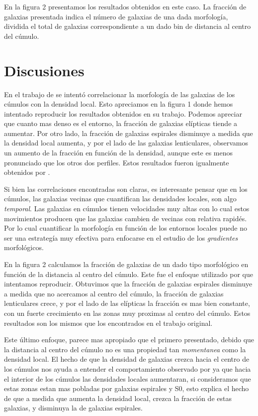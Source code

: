\documentclass[a4paper,10pt]{article}
\begin{document}
En la figura 2 presentamos los resultados obtenidos en este caso. La fracci\'on de galaxias presentada indica el n\'umero de galaxias de una dada morfolog\'ia, dividida el total de galaxias correspondiente a un dado bin de distancia al centro del c\'umulo.

\section{Discusiones}
En el trabajo de \citet{Dressler1980} se intent\'o correlacionar la morfolog\'ia de las galaxias de los c\'umulos con la densidad local. Esto apreciamos en la figura 1 donde hemos intentado reproducir los resultados obtenidos en su trabajo. Podemos apreciar que cuanto mas denso es el entorno, la fracci\'on de galaxias el\'ipticas tiende a aumentar. Por otro lado, la fracci\'on de galaxias espirales disminuye a medida que la densidad local aumenta, y por el lado de las galaxias lenticulares, observamos un aumento de la fracci\'on en funci\'on de la densidad, aunque este es menos pronunciado que los otros dos perfiles. Estos resultados fueron igualmente obtenidos por \citet{Dressler1980}. 

Si bien las correlaciones encontradas son claras, es interesante pensar que en los c\'umulos, las galaxias vecinas que cuantifican las densidades locales, son algo \textit{temporal}. Las galaxias en c\'umulos tienen velocidades muy altas con lo cual estos movimientos producen que las galaxias cambien de vecinas con relativa rapid\'es. Por lo cual cuantificar la morfolog\'ia en funci\'on de los entornos locales puede no ser una estrateg\'ia muy efectiva para enfocarse en el estudio de los \textit{gradientes} morfol\'ogicos. 

En la figura 2 calculamos la fracci\'on de galaxias de un dado tipo morfol\'ogico en funci\'on de la distancia al centro del c\'umulo. Este fue el enfoque utilizado por \citet{Whitmore1993} que intentamos reproducir. Obtuvimos que la fracci\'on de galaxias espirales disminuye a medida que no acercamos al centro del c\'umulo, la fracci\'on de galaxias lenticulares crece, y por el lado de las el\'ipticas la fracci\'on es mas bien constante, con un fuerte crecimiento en las zonas muy proximas al centro del c\'umulo. Estos resultados son los mismos que los encontrados en el trabajo original.

Este \'ultimo enfoque, parece mas apropiado que el primero presentado, debido que la distancia al centro del c\'umulo no es una propiedad tan \textit{momentanea} como la densidad local. El hecho de que la densidad de galaxias crezca hacia el centro de los c\'umulos nos ayuda a entender el comportamiento observado por \citet{Dressler1980} ya que hacia el interior de los c\'umulos las densidades locales aumentaran, si consideramos que estas zonas estan mas pobladas por galaxias espirales y S0, esto explica el hecho de que a medida que aumenta la densidad local, crezca la fracci\'on de estas galaxias, y disminuya la de galaxias espirales. 
\end{document}

